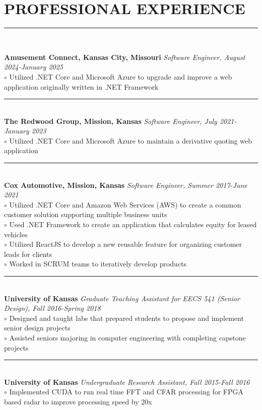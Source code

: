 \documentclass[twoside]{article}
\begin{document}
\section*{PROFESSIONAL EXPERIENCE}
\vspace{-1em}
\rule{\textwidth}{1pt}\\
\begin{adjustwidth}{0.2in}{0in}
\vspace{-1em}
\textbf{Amusement Connect, Kansas City, Missouri} \hfill \textit{Software Engineer, August 2024-January 2025}\\
$\circ$ Utilized .NET Core and Microsoft Azure to upgrade and improve a web application originally written in .NET Framework\\
\rule{7.3in}{0.5pt}\\
\textbf{The Redwood Group, Mission, Kansas} \hfill \textit{Software Engineer, July 2021-January 2023}\\
$\circ$ Utilized .NET Core and Microsoft Azure to maintain a derivative quoting web application\\
\rule{7.3in}{0.5pt}\\
\textbf{Cox Automotive, Mission, Kansas} \hfill \textit{Software Engineer, Summer 2017-June 2021}\\
$\circ$ Utilized .NET Core and Amazon Web Services (AWS) to create a common customer solution supporting multiple business units\\
$\circ$ Used .NET Framework to create an application that calculates equity for leased vehicles\\
$\circ$ Utilized ReactJS to develop a new reusable feature for organizing customer leads for clients\\
$\circ$ Worked in SCRUM teams to iteratively develop products\\
\rule{7.3in}{0.5pt}\\
\textbf{University of Kansas} \hfill \textit{Graduate Teaching Assistant for EECS 541 (Senior Design), Fall 2016-Spring 2018}\\
$\circ$ Designed and taught labs that prepared students to propose and implement senior design projects\\
$\circ$ Assisted seniors majoring in computer engineering with completing capstone projects\\
\rule{7.3in}{0.5pt}\\
\textbf{University of Kansas} \hfill \textit{Undergraduate Research Assistant, Fall 2015-Fall 2016}\\
$\circ$ Implemented CUDA to run real time FFT and CFAR processing for FPGA based radar to improve processing speed by 20x\\

\end{adjustwidth}
\end{document}
